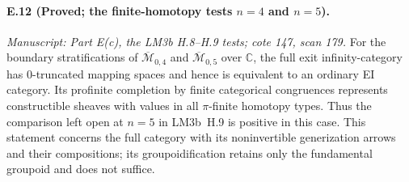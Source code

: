 \paragraph{E.12 (Proved; the finite-homotopy tests $n=4$ and $n=5$).}
\textit{Manuscript: Part E(c), the LM3b H.8--H.9 tests; cote 147, scan 179.}
For the boundary stratifications of $\overline{\mathcal M}_{0,4}$ and $\overline{\mathcal M}_{0,5}$ over $\mathbb C$, the full exit infinity-category has $0$-truncated mapping spaces and hence is equivalent to an ordinary EI category. Its profinite completion by finite categorical congruences represents constructible sheaves with values in all $\pi$-finite homotopy types. Thus the comparison left open at $n=5$ in LM3b~H.9 is positive in this case. This statement concerns the full category with its noninvertible generization arrows and their compositions; its groupoidification retains only the fundamental groupoid and does not suffice.
